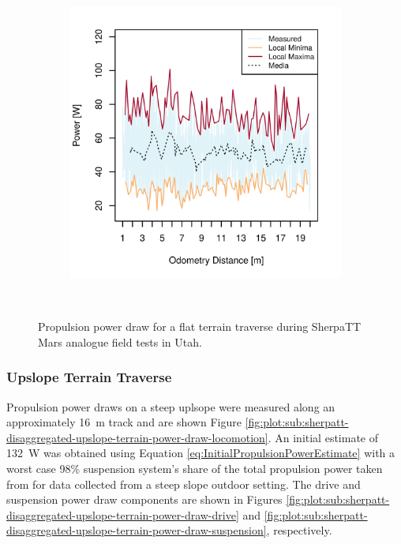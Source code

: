 \begin{figure}[h]
\begin{subfigure}[t]{\subfigureWidth}
        \includegraphics[height=\graphicsHeight]{sections/design/power-budget/plots/locomotion-power-draw-on-flat-terrain-2.png}
		\label{fig:plot:sub:sherpatt-flat-terrain-power-draw-2}
	\end{subfigure}\\[0.8ex]
    \caption[Propulsion power draw for a flat terrain traverse during SherpaTT Mars analogue field tests in Utah]
            {Propulsion power draw for a flat terrain traverse during SherpaTT Mars analogue field tests in Utah.}
    \label{fig:plot:sherpatt-flat-terrain-power-draw}
\vspace{-2ex}
\end{figure}





\pagebreak
\subsubsection{Upslope Terrain Traverse}
\label{sec:PowerBudget:PropulsionPowerBudget:UpslopeTerrainTraverse}
Propulsion power draws on a steep uplsope were measured along an approximately \SI{16}{\meter} track and are shown Figure \ref{fig:plot:sub:sherpatt-disaggregated-upslope-terrain-power-draw-locomotion}. An initial estimate of \SI{132}{\watt} was obtained using Equation \ref{eq:InitialPropulsionPowerEstimate} with a worst case 98\% suspension system's share of the total propulsion power taken from  for data collected from a steep slope outdoor setting. The drive and suspension power draw components are shown in Figures \ref{fig:plot:sub:sherpatt-disaggregated-upslope-terrain-power-draw-drive} and \ref{fig:plot:sub:sherpatt-disaggregated-upslope-terrain-power-draw-suspension}, respectively.

